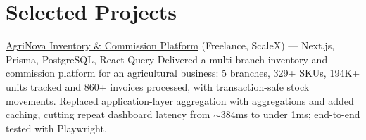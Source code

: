






% 

% 
% 

% 

% 





\section*{Selected Projects}
\BigDivider

\cvprojectfull
{\href{https://agrinova-demo.vercel.app/}{AgriNova Inventory \& Commission Platform} (Freelance, ScaleX) --- Next.js, Prisma, PostgreSQL, React Query}
{}
{Delivered a multi-branch inventory and commission platform for an agricultural business: 5 branches, 329+ SKUs, 194K+ units tracked and 860+ invoices processed, with transaction-safe stock movements.}
{Replaced application-layer aggregation with  aggregations and added  caching, cutting repeat dashboard latency from $\sim$384ms to under 1ms; end-to-end tested with Playwright.}

